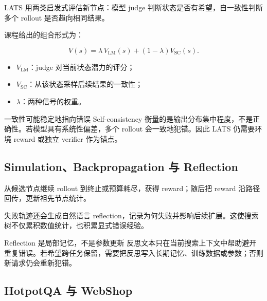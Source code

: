LATS 用两类启发式评估新节点：模型 judge 判断状态是否有希望，自一致性判断多个 rollout 是否趋向相同结果。


课程给出的组合形式为：

$$
V(s)=\lambda\,V_{\mathrm{LM}}(s)+(1-\lambda)V_{\mathrm{SC}}(s).
$$

\begin{itemize}
    \item $V_{\mathrm{LM}}$：judge 对当前状态潜力的评分；
    \item $V_{\mathrm{SC}}$：从该状态采样后续结果的一致性；
    \item $\lambda$：两种信号的权重。
\end{itemize}

\begin{warningbox}{一致性可能稳定地指向错误}
Self-consistency 衡量的是输出分布集中程度，不是正确性。若模型具有系统性偏差，多个 rollout 会一致地犯错。因此 LATS 仍需要环境 reward 或独立 verifier 作为锚点。
\end{warningbox}

\subsection{Simulation、Backpropagation 与 Reflection}

从候选节点继续 rollout 到终止或预算耗尽，获得 reward；随后把 reward 沿路径回传，更新祖先节点统计。



失败轨迹还会生成自然语言 reflection，记录为何失败并影响后续扩展。这使搜索树不仅累积数值统计，也积累显式错误经验。

\begin{knowledgebox}{Reflection 是局部记忆，不是参数更新}
反思文本只在当前搜索上下文中帮助避开重复错误。若希望跨任务保留，需要把反思写入长期记忆、训练数据或参数；否则新请求仍会重新犯错。
\end{knowledgebox}

\subsection{HotpotQA 与 WebShop}

